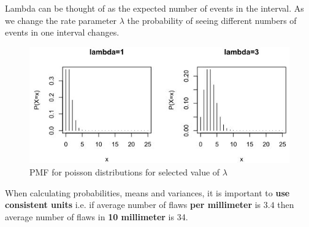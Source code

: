 \documentclass[10pt,a4paper]{article}
\begin{document}
Lambda can be thought of as the expected number of events in the interval. As we change the rate
parameter $\lambda$ the probability of seeing different numbers of events in one interval changes.

\begin{figure} [h!]
    \centering
    \includegraphics[scale=0.85]{PMF poisson.JPG}
    \caption{PMF for poisson distributions for selected value of $\lambda$}
\end{figure}

When calculating probabilities, means and variances, it is important to \textbf{use consistent
units} i.e. if average number of flaws \textbf{per millimeter} is $3.4$ then average number of flaws
in \textbf{10 millimeter} is 34.
\end{document}
